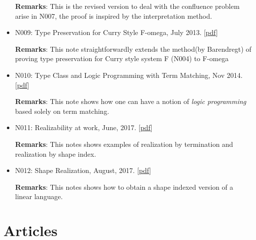 \documentclass[10pt]{article}
\begin{document}
\begin{itemize}
\noindent \textbf{Remarks}: This is the revised version to deal with the confluence problem arise in N007, the proof is inspired by the interpretation method. 

\item N009: Type Preservation for Curry Style F-omega, July 2013. [\href{../../document/notes/fomega-presv.pdf}{pdf}]

\noindent \textbf{Remarks}: This note straightforwardly extends the method(by Barendregt) of proving type preservation for Curry style system F (N004) to F-omega

\item N010: Type Class and Logic Programming with Term Matching, Nov 2014. [\href{../../document/notes/tm.pdf}{pdf}]

\noindent \textbf{Remarks}: This note shows how one can have a notion of \textit{logic programming} based solely on term matching. 

\item N011: Realizability at work,  June, 2017. [\href{../../document/notes/realization.pdf}{pdf}]

  \noindent \textbf{Remarks}: This notes shows examples of realization by termination and realization by shape index. 

\item N012: Shape Realization,  August, 2017. [\href{../../document/notes/shape-real.pdf}{pdf}]

  \noindent \textbf{Remarks}: This notes shows how to obtain a shape indexed version of a linear language. 
  

  
\end{itemize}

\section*{Articles}
\end{document}
